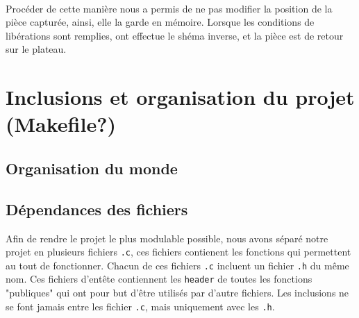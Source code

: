         \noindent \\ Procéder de cette manière nous a permis de ne pas modifier la position de la pièce capturée, ainsi, elle la garde en mémoire. Lorsque les conditions de libérations sont remplies, ont effectue le shéma inverse, et la pièce est de retour sur le plateau. 

\section{Inclusions et organisation du projet (Makefile?)}

    \subsection{Organisation du monde}
    \subsection{Dépendances des fichiers}\label{part:graph_src}
        Afin de rendre le projet le plus modulable possible, nous avons séparé notre projet en plusieurs fichiers \texttt{.c}, ces fichiers contienent les fonctions qui permettent au tout de fonctionner. Chacun de ces fichiers \texttt{.c} incluent un fichier \texttt{.h} du même nom. Ces fichiers d'entête contiennent les \texttt{header} de toutes les fonctions "publiques" qui ont pour but d'être utilisés par d'autre fichiers. Les inclusions ne se font jamais entre les fichier \texttt{.c}, mais uniquement avec les \texttt{.h}.
        
